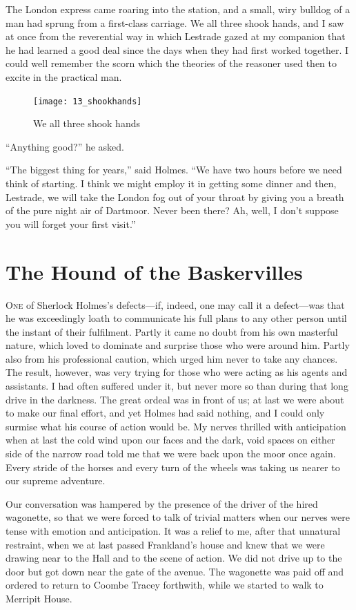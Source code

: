 \documentclass[paper=5.5in:8.5in,BCOR=7mm,twoside,DIV=calc,12pt,usegeometry,openany,chapterprefix,endperiod]{scrbook} %
\begin{document}
The London express came roaring into the station, and a small, wiry bulldog of a man had sprung from a first-class carriage. We all three shook hands, and I saw at once from the reverential way in which Lestrade gazed at my companion that he had learned a good deal since the days when they had first worked together. I could well remember the scorn which the theories of the reasoner used then to excite in the practical man.

\begin{figure}[h]
\centering
\texttt{[image: 13\_shookhands]}
\caption{We all three shook hands}
\end{figure}

\enquote{Anything good?} he asked.

\enquote{The biggest thing for years,} said Holmes. \enquote{We have two hours before we need think of starting. I think we might employ it in getting some dinner and then, Lestrade, we will take the London fog out of your throat by giving you a breath of the pure night air of Dartmoor. Never been there? Ah, well, I don't suppose you will forget your first visit.}

\chapter{The Hound of the Baskervilles}
\lettrine[lines=1]{O}{ne} of Sherlock Holmes's defects\nobreakdash---if, indeed, one may call it a defect\nobreakdash---was that he was exceedingly loath to communicate his full plans to any other person until the instant of their fulfilment. Partly it came no doubt from his own masterful nature, which loved to dominate and surprise those who were around him. Partly also from his professional caution, which urged him never to take any chances. The result, however, was very trying for those who were acting as his agents and assistants. I had often suffered under it, but never more so than during that long drive in the darkness. The great ordeal was in front of us; at last we were about to make our final effort, and yet Holmes had said nothing, and I could only surmise what his course of action would be. My nerves thrilled with anticipation when at last the cold wind upon our faces and the dark, void spaces on either side of the narrow road told me that we were back upon the moor once again. Every stride of the horses and every turn of the wheels was taking us nearer to our supreme adventure.

Our conversation was hampered by the presence of the driver of the hired wagonette, so that we were forced to talk of trivial matters when our nerves were tense with emotion and anticipation. It was a relief to me, after that unnatural restraint, when we at last passed Frankland's house and knew that we were drawing near to the Hall and to the scene of action. We did not drive up to the door but got down near the gate of the avenue. The wagonette was paid off and ordered to return to Coombe Tracey forthwith, while we started to walk to Merripit House.
\end{document}
